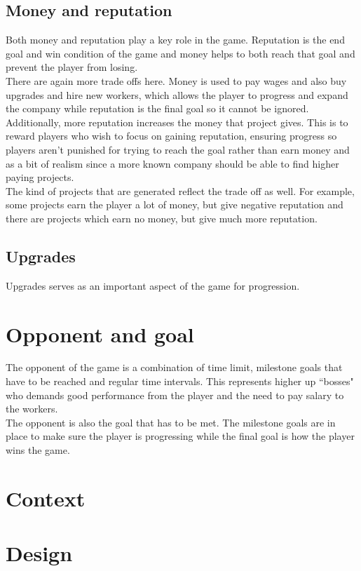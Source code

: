 \documentclass[11pt]{article}
\newcommand{\n}[0]{\\[\baselineskip]}
\begin{document}
\subsection{Money and reputation}
Both money and reputation play a key role in the game. Reputation is the end goal and win condition of the game and money helps to both reach that goal and prevent the player from losing. 
\n
There are again more trade offs here. Money is used to pay wages and also buy upgrades and hire new workers, which allows the player to progress and expand the company while reputation is the final goal so it cannot be ignored. Additionally, more reputation increases the money that project gives. This is to reward players who wish to focus on gaining reputation, ensuring progress so players aren't punished for trying to reach the goal rather than earn money and as a bit of realism since a more known company should be able to find higher paying projects. 
\n
The kind of projects that are generated reflect the trade off as well. For example, some projects earn the player a lot of money, but give negative reputation and there are projects which earn no money, but give much more reputation. 


\subsection{Upgrades}
Upgrades serves as an important aspect of the game for progression. 


\section{Opponent and goal}
The opponent of the game is a combination of time limit, milestone goals  that have to be reached and regular time intervals. This represents higher up ``bosses" who demands good performance from the player and the need to pay salary to the workers. 
\n
The opponent is also the goal that has to be met. The milestone goals are in place to make sure the player is progressing while the final goal is how the player wins the game. 


\section{Context}

\section{Design}
\end{document}
